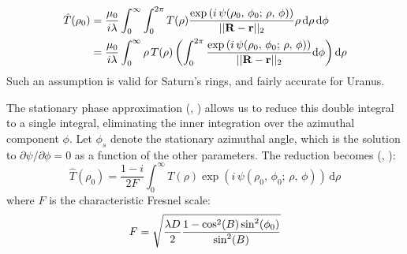 \documentclass{article}
\theoremstyle{plain}
\begin{document}
        \begin{subequations}
            \begin{align}
                \hat{T}(\rho_{0})
                &=\frac{\mu_{0}}{i\lambda}\int_{0}^{\infty}\int_{0}^{2\pi}
                    T(\rho)
                    \frac{%
                        \exp\left(
                            i\,\psi(\rho_{0},\,\phi_{0};\,\rho,\,\phi)
                        \right)
                    }{%
                        ||\mathbf{R}-\mathbf{r}||_{2}
                    }
                    \rho\,\textrm{d}\rho\,\textrm{d}\phi\\
                &=\frac{\mu_{0}}{i\lambda}\int_{0}^{\infty}
                    \rho\,T(\rho)\left(
                        \int_{0}^{2\pi}
                        \frac{%
                            \exp\left(
                                i\,\psi(\rho_{0},\,\phi_{0};\,\rho,\,\phi)
                            \right)
                        }{%
                            ||\mathbf{R}-\mathbf{r}||_{2}
                        }
                        \textrm{d}\phi
                    \right)
                    \textrm{d}\rho
                \end{align}
        \end{subequations}
        Such an assumption is valid for Saturn's rings, and fairly accurate for
        Uranus.
        \par\hfill\par
        The stationary phase approximation
        (\cite[p.~80]{ThompsonKelvinStationaryPhaseOriginalPaper},
        \cite[p.~76]{WongAsymptoticsOfIntegrals})
        allows us to reduce this double
        integral to a single integral, eliminating the inner integration over
        the azimuthal component $\phi$. Let $\phi_{s}$ denote the stationary
        azimuthal angle, which is the solution to
        $\partial\psi/\partial\phi=0$ as a function of the other
        parameters. The reduction becomes
        (\cite[Eqn.~5]{MTR86},
        \cite[Ch.~16]{WaltherRayAndWaveTheoryOfLenses}):
        \begin{equation}
            \label{eqn:single_variable_huygens}
            \hat{T}(\rho_{0})
            =\frac{1-i}{2F}\int_{0}^{\infty}
                T(\rho)\exp\left(
                    i\,\psi(\rho_{0},\,\phi_{0};\,\rho,\,\phi)
                \right)
                \,\textrm{d}\rho
        \end{equation}
        where $F$ is the characteristic Fresnel scale:
        \begin{equation}
            \label{eqn:fresnel_scale}
            F=
            \sqrt{%
                \frac{\lambda{D}}{2}%
                \frac{1-\cos^{2}(B)\sin^{2}(\phi_{0})}{\sin^{2}(B)}%
            }
        \end{equation}
\end{document}
